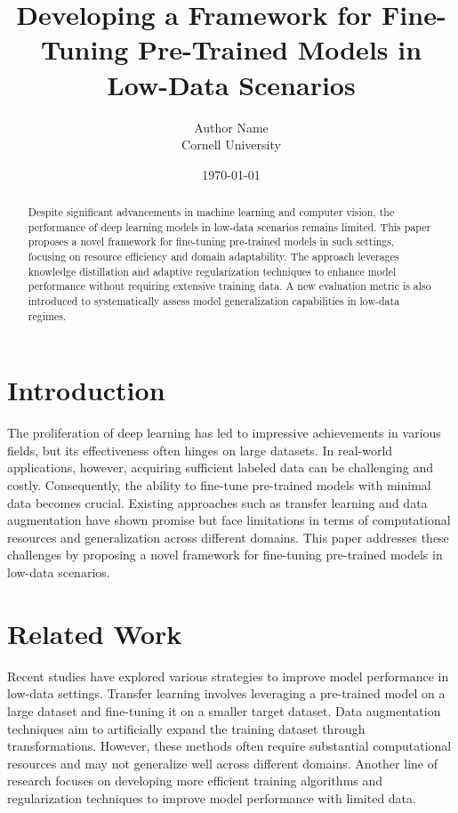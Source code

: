 \documentclass{article}
\title{Developing a Framework for Fine-Tuning Pre-Trained Models in Low-Data Scenarios}
\author{Author Name \\ Cornell University}
\date{\today}
\begin{document}
\maketitle

\begin{abstract}
Despite significant advancements in machine learning and computer vision, the performance of deep learning models in low-data scenarios remains limited. This paper proposes a novel framework for fine-tuning pre-trained models in such settings, focusing on resource efficiency and domain adaptability. The approach leverages knowledge distillation and adaptive regularization techniques to enhance model performance without requiring extensive training data. A new evaluation metric is also introduced to systematically assess model generalization capabilities in low-data regimes.
\end{abstract}

\section{Introduction}
\label{sec:introduction}
The proliferation of deep learning has led to impressive achievements in various fields, but its effectiveness often hinges on large datasets. In real-world applications, however, acquiring sufficient labeled data can be challenging and costly. Consequently, the ability to fine-tune pre-trained models with minimal data becomes crucial. Existing approaches such as transfer learning and data augmentation have shown promise but face limitations in terms of computational resources and generalization across different domains. This paper addresses these challenges by proposing a novel framework for fine-tuning pre-trained models in low-data scenarios.

\section{Related Work}
\label{sec:related-work}
Recent studies have explored various strategies to improve model performance in low-data settings. Transfer learning \cite{pan2009survey} involves leveraging a pre-trained model on a large dataset and fine-tuning it on a smaller target dataset. Data augmentation techniques \cite{zoph2017learning} aim to artificially expand the training dataset through transformations. However, these methods often require substantial computational resources and may not generalize well across different domains. Another line of research focuses on developing more efficient training algorithms \cite{liu2019few} and regularization techniques \cite{zhang2016understanding} to improve model performance with limited data.
\end{document}
